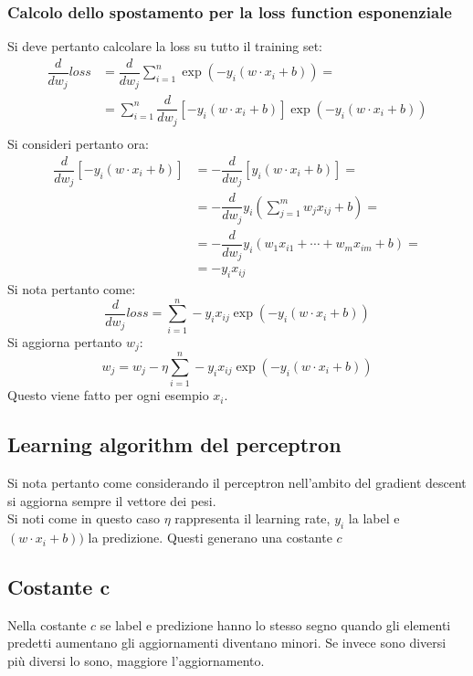 		\subsubsection{Calcolo dello spostamento per la loss function esponenziale}
		Si deve pertanto calcolare la loss su tutto il training set:
		\begin{align*}
			\dfrac{d}{dw_j}loss &=\dfrac{d}{dw_j}\sum\limits_{i=1}^n\exp(-y_i(w\cdot x_i + b))=\\
			&=\sum\limits_{i=1}^n\dfrac{d}{dw_j}[-y_i(w\cdot x_i+b)]\exp(-y_i(w\cdot x_i+b))\\
		\end{align*}
		Si consideri pertanto ora:
		\begin{align*}
			\dfrac{d}{dw_j}[-y_i(w\cdot x_i + b)]&=-\dfrac{d}{dw_j}[y_i(w\cdot x_i + b)]=\\
			&=-\dfrac{d}{dw_j}y_i(\sum_{j=1}^{m}w_jx_{ij}+b)=\\
			&=-\dfrac{d}{dw_j}y_i(w_1x_{i1}+\cdots+w_mx_{im}+b)=\\
			&=-y_ix_{ij}
		\end{align*}
		Si nota pertanto come:
		$$\dfrac{d}{dw_j}loss=\sum\limits_{i=1}^n-y_ix_{ij}\exp(-y_i(w\cdot x_i+b))$$
		Si aggiorna pertanto $w_j$:
		$$w_j=w_j-\eta\sum\limits_{i=1}^n-y_ix_{ij}\exp(-y_i(w\cdot x_i+b))$$
		Questo viene fatto per ogni esempio $x_i$.

	\subsection{Learning algorithm del perceptron}
	Si nota pertanto come considerando il perceptron nell'ambito del gradient descent si aggiorna sempre il vettore dei pesi.\\
	
	Si noti come in questo caso $\eta$ rappresenta il learning rate, $y_i$ la label e $(w\cdot x_i + b))$ la predizione.
	Questi generano una costante $c$

	\subsection{Costante $\mathbf{c}$}
	Nella costante $c$ se label e predizione hanno lo stesso segno quando gli elementi predetti aumentano gli aggiornamenti diventano minori.
	Se invece sono diversi pi\`u diversi lo sono, maggiore l'aggiornamento.
	
